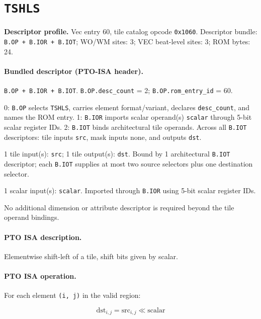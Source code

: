 \section{\texttt{TSHLS}}
\noindent\textbf{Descriptor profile.} Vec entry 60, tile catalog opcode \texttt{0x1060}. Descriptor bundle: \texttt{B.OP + B.IOR + B.IOT}; WO/WM sites: 3; VEC beat-level sites: 3; ROM bytes: 24.\par\smallskip
{}
\paragraph{Bundled descriptor (PTO-ISA header).}
\begin{description}[leftmargin=0.18\linewidth,style=nextline]
\item[Bundle] \texttt{B.OP + B.IOR + B.IOT}. \texttt{B.OP.desc\_count} = 2; \texttt{B.OP.rom\_entry\_id} = 60.
\item[Assembly] 0: \texttt{B.OP} selects \texttt{TSHLS}, carries element format/variant, declares \texttt{desc\_count}, and names the ROM entry. 1: \texttt{B.IOR} imports scalar operand(s) \texttt{scalar} through 5-bit scalar register IDs. 2: \texttt{B.IOT} binds architectural tile operands. Across all \texttt{B.IOT} descriptors: tile inputs \texttt{src}, mask inputs none, and outputs \texttt{dst}.
\item[Tile operands] 1 tile input(s): \texttt{src}; 1 tile output(s): \texttt{dst}. Bound by 1 architectural \texttt{B.IOT} descriptor; each \texttt{B.IOT} supplies at most two source selectors plus one destination selector.
\item[Scalar GPR operands] 1 scalar input(s): \texttt{scalar}. Imported through \texttt{B.IOR} using 5-bit scalar register IDs.
\item[Metadata operands] No additional dimension or attribute descriptor is required beyond the tile operand bindings.
\end{description}
\par\smallskip
{\small
\paragraph{PTO ISA description.}
Elementwise shift-left of a tile, shift bits given by scalar.
\paragraph{PTO ISA operation.}
For each element \texttt{(i, j)} in the valid region:

\[
\mathrm{dst}_{i,j} = \mathrm{src}_{i,j} \ll \mathrm{scalar}
\]
}\par\smallskip
